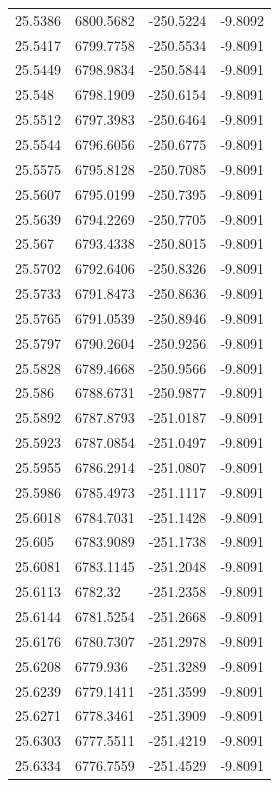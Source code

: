 \begin{table}[H]
\begin{tabular}{llll}
25.5386 & 6800.5682 & -250.5224 & -9.8092 \\
25.5417 & 6799.7758 & -250.5534 & -9.8091 \\
25.5449 & 6798.9834 & -250.5844 & -9.8091 \\
25.548 & 6798.1909 & -250.6154 & -9.8091 \\
25.5512 & 6797.3983 & -250.6464 & -9.8091 \\
25.5544 & 6796.6056 & -250.6775 & -9.8091 \\
25.5575 & 6795.8128 & -250.7085 & -9.8091 \\
25.5607 & 6795.0199 & -250.7395 & -9.8091 \\
25.5639 & 6794.2269 & -250.7705 & -9.8091 \\
25.567 & 6793.4338 & -250.8015 & -9.8091 \\
25.5702 & 6792.6406 & -250.8326 & -9.8091 \\
25.5733 & 6791.8473 & -250.8636 & -9.8091 \\
25.5765 & 6791.0539 & -250.8946 & -9.8091 \\
25.5797 & 6790.2604 & -250.9256 & -9.8091 \\
25.5828 & 6789.4668 & -250.9566 & -9.8091 \\
25.586 & 6788.6731 & -250.9877 & -9.8091 \\
25.5892 & 6787.8793 & -251.0187 & -9.8091 \\
25.5923 & 6787.0854 & -251.0497 & -9.8091 \\
25.5955 & 6786.2914 & -251.0807 & -9.8091 \\
25.5986 & 6785.4973 & -251.1117 & -9.8091 \\
25.6018 & 6784.7031 & -251.1428 & -9.8091 \\
25.605 & 6783.9089 & -251.1738 & -9.8091 \\
25.6081 & 6783.1145 & -251.2048 & -9.8091 \\
25.6113 & 6782.32 & -251.2358 & -9.8091 \\
25.6144 & 6781.5254 & -251.2668 & -9.8091 \\
25.6176 & 6780.7307 & -251.2978 & -9.8091 \\
25.6208 & 6779.936 & -251.3289 & -9.8091 \\
25.6239 & 6779.1411 & -251.3599 & -9.8091 \\
25.6271 & 6778.3461 & -251.3909 & -9.8091 \\
25.6303 & 6777.5511 & -251.4219 & -9.8091 \\
25.6334 & 6776.7559 & -251.4529 & -9.8091 \\

\end{tabular}
\end{table}
